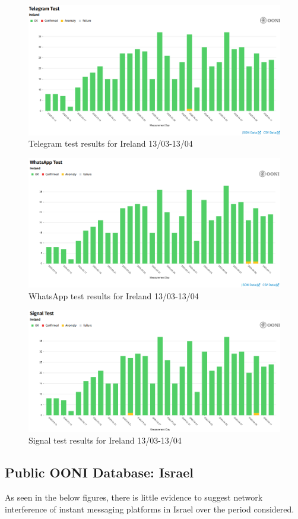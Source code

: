 \begin{figure} [H]
    \centering
    \includegraphics[width=0.5\linewidth]{IREOONIDBIMTL.png}
    \caption{Telegram test results for Ireland 13/03-13/04}
    \label{fig:enter-label}
\end{figure}

\begin{figure} [H]
    \centering
    \includegraphics[width=0.5\linewidth]{IREOONIDBIMWHATS.png}
    \caption{WhatsApp test results for Ireland 13/03-13/04}
    \label{fig:enter-label}
\end{figure}

\begin{figure} [H]
    \centering
    \includegraphics[width=0.5\linewidth]{IREOONIDBSIG.png}
    \caption{Signal test results for Ireland 13/03-13/04}
    \label{fig:enter-label}
\end{figure}



\subsection{Public OONI Database: Israel}
As seen in the below figures, there is little evidence to suggest network interference of instant messaging platforms in Israel over the period considered.

